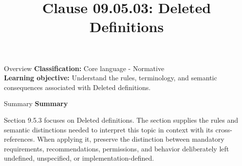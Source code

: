 \documentclass[10pt,letterpaper]{article}
\title{Clause 09.05.03: Deleted Definitions}
\author{}
\date{}
\begin{document}
\maketitle
\begin{CornellOverviewBox}{Overview}
\textbf{Classification:} Core language - Normative\\[2pt]
\textbf{Learning objective:} Understand the rules, terminology, and semantic consequences associated with Deleted definitions.
\end{CornellOverviewBox}\begin{CornellSummaryBox}{Summary}
{\sffamily\bfseries\color{Accent} Summary}\par\vspace{3pt}Section 9.5.3 focuses on Deleted definitions. The section supplies the rules and semantic distinctions needed to interpret this topic in context with its cross-references. When applying it, preserve the distinction between mandatory requirements, recommendations, permissions, and behavior deliberately left undefined, unspecified, or implementation-defined.
\end{CornellSummaryBox}
\end{document}
